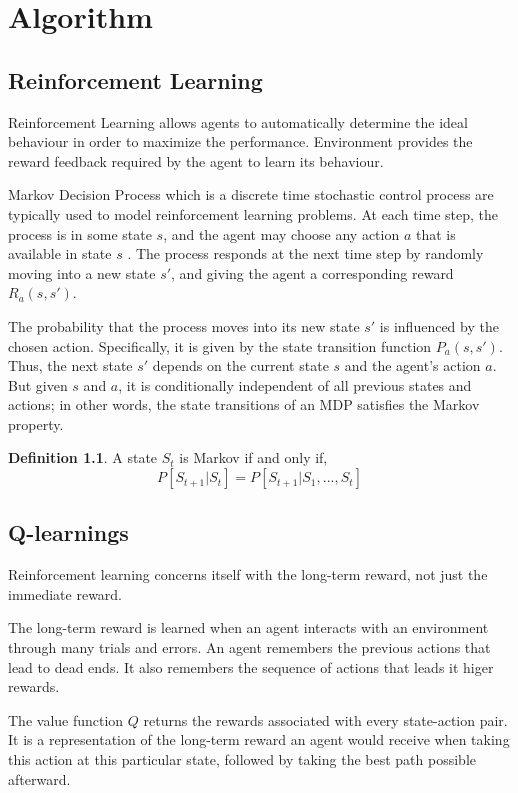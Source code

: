 \documentclass[12pt]{extreport}
\theoremstyle{plain}
\theoremstyle{definition}
\newtheorem{defn}[thm]{Definition} %
\begin{document}
\chapter{Algorithm}

\section{Reinforcement Learning}

Reinforcement Learning allows agents to automatically determine the ideal behaviour
 in order to maximize the performance. Environment provides the reward feedback
 required by the agent to learn its behaviour.

Markov Decision Process which is a discrete time stochastic control process are
typically used to model reinforcement learning problems. At each time step, the
process is in some state $ s $, and the agent may choose any action $ a $ that
is available in state $ s $ . The process responds at the next time step by
randomly moving into a new state $ s' $, and giving the agent a
corresponding reward $ R_{a}(s,s') $.

The probability that the process moves into its new state $ s' $ is
influenced by the chosen action. Specifically, it is given by the state transition
function $ P_{a}(s,s') $. Thus, the next state $ s' $
depends on the current state $ s $ and the agent's action $ a $.
But given $ s $ and $ a $, it is conditionally independent
of all previous states and actions; in other words, the state transitions of an
MDP satisfies the Markov property.

\begin{defn}
A state $ S_t $ is Markov if and only if,
$$ P[S_{t+1} | S_t] = P[S_{t+1} | S_1, ..., S_t] $$
\end{defn}


\section{Q-learnings}

Reinforcement learning concerns itself with the long-term reward, not just
the immediate reward.

The long-term reward is learned when an agent interacts with an environment
through many trials and errors. An agent remembers the previous actions that
lead to dead ends. It also remembers the sequence of actions that
leads it higer rewards.

The value function $ Q $ returns the rewards associated with every state-action pair.
It is a representation of the long-term reward an agent would receive when
taking this action at this particular state, followed by taking the best path
possible afterward.
\end{document}
